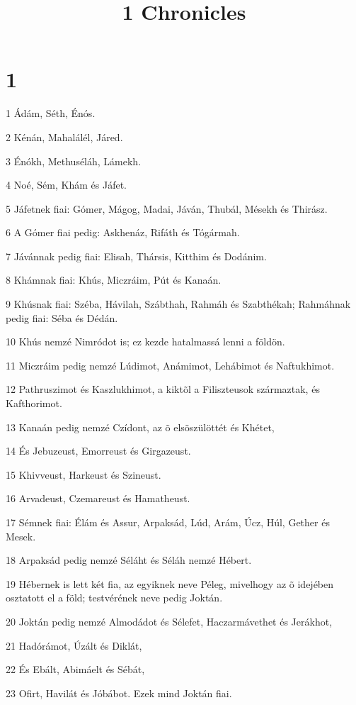 

\title{1 Chronicles}


\chapter{1}

\par 1 Ádám, Séth, Énós.
\par 2 Kénán, Mahalálél, Járed.
\par 3 Énókh, Methuséláh, Lámekh.
\par 4 Noé, Sém, Khám és Jáfet.
\par 5 Jáfetnek fiai: Gómer, Mágog, Madai, Jáván, Thubál, Mésekh és Thirász.
\par 6 A Gómer fiai pedig: Askhenáz, Rifáth és Tógármah.
\par 7 Jávánnak pedig fiai: Elisah, Thársis, Kitthim és Dodánim.
\par 8 Khámnak fiai: Khús, Miczráim, Pút és Kanaán.
\par 9 Khúsnak fiai: Széba, Hávilah, Szábthah, Rahmáh és Szabthékah; Rahmáhnak pedig fiai: Séba és Dédán.
\par 10 Khús nemzé Nimródot is; ez kezde hatalmassá lenni a földön.
\par 11 Miczráim pedig nemzé Lúdimot, Anámimot, Lehábimot és Naftukhimot.
\par 12 Pathruszimot és Kaszlukhimot, a kiktõl a Filiszteusok származtak, és Kafthorimot.
\par 13 Kanaán pedig nemzé Czídont, az õ elsõszülöttét és Khétet,
\par 14 És Jebuzeust, Emorreust és Girgazeust.
\par 15 Khivveust, Harkeust és Szineust.
\par 16 Arvadeust, Czemareust és Hamatheust.
\par 17 Sémnek fiai: Élám és Assur, Arpaksád, Lúd, Arám, Úcz, Húl, Gether és Mesek.
\par 18 Arpaksád pedig nemzé Séláht és Séláh nemzé Hébert.
\par 19 Hébernek is lett két fia, az egyiknek neve Péleg, mivelhogy az õ idejében osztatott el a föld; testvérének neve pedig Joktán.
\par 20 Joktán pedig nemzé Almodádot és Sélefet, Haczarmávethet és Jerákhot,
\par 21 Hadórámot, Úzált és Diklát,
\par 22 És Ebált, Abimáelt és Sébát,
\par 23 Ofirt, Havilát és Jóbábot. Ezek mind Joktán fiai.
